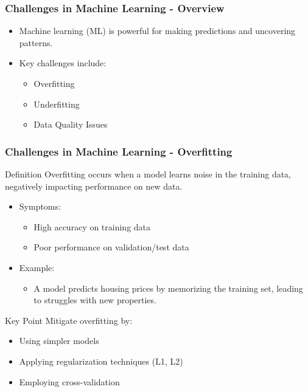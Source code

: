 \documentclass[aspectratio=169]{beamer}
\begin{document}
\begin{frame}[fragile]
    \frametitle{Challenges in Machine Learning - Overview}
    \begin{itemize}
        \item Machine learning (ML) is powerful for making predictions and uncovering patterns.
        \item Key challenges include:
        \begin{itemize}
            \item Overfitting
            \item Underfitting
            \item Data Quality Issues
        \end{itemize}
    \end{itemize}
\end{frame}

\begin{frame}[fragile]
    \frametitle{Challenges in Machine Learning - Overfitting}
    \begin{block}{Definition}
        Overfitting occurs when a model learns noise in the training data, negatively impacting performance on new data.
    \end{block}
    \begin{itemize}
        \item Symptoms:
        \begin{itemize}
            \item High accuracy on training data
            \item Poor performance on validation/test data
        \end{itemize}
        \item Example:
        \begin{itemize}
            \item A model predicts housing prices by memorizing the training set, leading to struggles with new properties.
        \end{itemize}
    \end{itemize}
    \begin{block}{Key Point}
        Mitigate overfitting by:
        \begin{itemize}
            \item Using simpler models
            \item Applying regularization techniques (L1, L2)
            \item Employing cross-validation
        \end{itemize}
    \end{block}
\end{frame}
\end{document}
